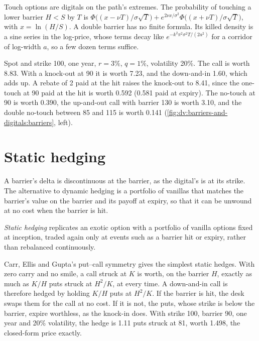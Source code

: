 Touch options are digitals on the path's extremes. The probability of touching a lower barrier $H<S$ by $T$ is
$\Phi\bigl((x-\nu T)/\sigma\sqrt T\bigr)+e^{2\nu x/\sigma^2}\Phi\bigl((x+\nu T)/\sigma\sqrt T\bigr)$, with
$x=\ln(H/S)$. A double barrier has no finite formula. Its killed density is a sine series in the log-price, whose
terms decay like $e^{-k^2\pi^2\sigma^2T/(2a^2)}$ for a corridor of log-width $a$, so a few dozen terms suffice.

\begin{example}\label{ex:dv:barriers-and-digitals:sheet}
Spot and strike 100, one year, $r=3\%$, $q=1\%$, volatility 20\%. The call is worth 8.83. With a knock-out at 90 it is
worth 7.23, and the down-and-in 1.60, which adds up. A rebate of 2 paid at the hit raises the knock-out to 8.41, since
the one-touch at 90 paid at the hit is worth 0.592 (0.581 paid at expiry). The no-touch at 90 is worth 0.390, the up-and-out
call with barrier 130 is worth 3.10, and the double no-touch between 85 and 115 is worth 0.141
(\cref{fig:dv:barriers-and-digitals:barriers}, left).
\end{example}

\section{Static hedging}

A barrier's delta is discontinuous at the barrier, as the digital's is at its strike. The alternative to dynamic
hedging is a portfolio of vanillas that matches the barrier's value on the barrier and its payoff at expiry, so
that it can be unwound at no cost when the barrier is hit.

\begin{definition}\label{def:dv:barriers-and-digitals:static}
\emph{Static hedging} replicates an exotic option with a portfolio of vanilla options fixed at
inception, traded again only at events such as a barrier hit or expiry, rather than rebalanced continuously.
\end{definition}

Carr, Ellis and Gupta's put--call symmetry gives the simplest static hedges. With zero carry and no smile, a call
struck at $K$ is worth, on the barrier $H$, exactly as much as $K/H$ puts struck at $H^2/K$, at every time. A
down-and-in call is therefore hedged by holding $K/H$ puts at $H^2/K$. If the barrier is hit, the desk swaps them for
the call at no cost. If it is not, the puts, whose strike is below the barrier, expire worthless, as the knock-in does.
With strike 100, barrier 90, one year and 20\% volatility, the hedge is 1.11 puts struck at 81, worth 1.498, the
closed-form price exactly.

